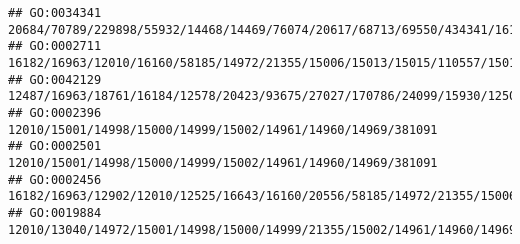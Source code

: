 \documentclass[
]{article}
\begin{document}
\begin{verbatim}
## GO:0034341                                                                                                                                                                                                                                                          20684/70789/229898/55932/14468/14469/76074/20617/68713/69550/434341/16160/18126/20304/76815/54483/12265/547253/11629/15018/110558/24108/16149/12705
## GO:0002711                                                                                                                                                                                                                                                                               16182/16963/12010/16160/58185/14972/21355/15006/15013/15015/110557/15018/68395/110558/15039/100529082/15024/667977/14990/20371
## GO:0042129                                                                                                                                                                                                                                  12487/16963/18761/16184/12578/20423/93675/27027/170786/24099/15930/12501/16160/20304/12775/20533/72049/208154/320484/15000/14999/14960/547431/11629/12511/60533/58205/20371
## GO:0002396                                                                                                                                                                                                                                                                                                                                                 12010/15001/14998/15000/14999/15002/14961/14960/14969/381091
## GO:0002501                                                                                                                                                                                                                                                                                                                                                 12010/15001/14998/15000/14999/15002/14961/14960/14969/381091
## GO:0002456                                                                                                                                                                                                                                          16182/16963/12902/12010/12525/16643/16160/20556/58185/14972/21355/15006/15013/15015/110557/15018/68395/110558/15039/100529082/15024/667977/14990/224840/60533/20371
## GO:0019884                                                                                                                                                                                                                                                                                                                         12010/13040/14972/15001/14998/15000/14999/21355/15002/14961/14960/14969/381091/16149

\end{verbatim}
\end{document}
